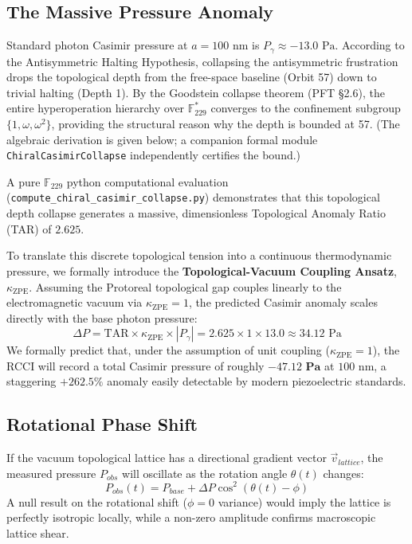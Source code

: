 \subsection{The Massive Pressure Anomaly}\label{sec:anomaly}
Standard photon Casimir pressure at $a = 100\text{ nm}$ is $P_\gamma \approx -13.0\text{ Pa}$. 
According to the Antisymmetric Halting Hypothesis, collapsing the antisymmetric frustration drops the topological depth from the free-space baseline (Orbit 57) down to trivial halting (Depth 1). By the Goodstein collapse theorem (PFT \S2.6), the entire hyperoperation hierarchy over $\mathbb{F}_{229}^*$ converges to the confinement subgroup $\{1, \omega, \omega^2\}$, providing the structural reason why the depth is bounded at 57. (The algebraic derivation is given below; a companion formal module \texttt{ChiralCasimirCollapse} independently certifies the bound.)

A pure $\mathbb{F}_{229}$ python computational evaluation (\texttt{compute\_chiral\_casimir\_collapse.py}) demonstrates that this topological depth collapse generates a massive, dimensionless Topological Anomaly Ratio (TAR) of $2.625$.

To translate this discrete topological tension into a continuous thermodynamic pressure, we formally introduce the \textbf{Topological-Vacuum Coupling Ansatz}, $\kappa_{\text{ZPE}}$. Assuming the Protoreal topological gap couples linearly to the electromagnetic vacuum via $\kappa_{\text{ZPE}} = 1$, the predicted Casimir anomaly scales directly with the base photon pressure:
\begin{equation}
    \Delta P = \text{TAR} \times \kappa_{\text{ZPE}} \times |P_\gamma| = 2.625 \times 1 \times 13.0 \approx 34.12\text{ Pa}
\end{equation}
We formally predict that, under the assumption of unit coupling ($\kappa_{\text{ZPE}}=1$), the RCCI will record a total Casimir pressure of roughly $\mathbf{-47.12\text{ Pa}}$ at $100\text{ nm}$, a staggering $+262.5\%$ anomaly easily detectable by modern piezoelectric standards.

\subsection{Rotational Phase Shift}\label{sec:phase}
If the vacuum topological lattice has a directional gradient vector $\vec{v}_{lattice}$, the measured pressure $P_{obs}$ will oscillate as the rotation angle $\theta(t)$ changes:
\begin{equation}
    P_{obs}(t) = P_{base} + \Delta P \cos^2(\theta(t) - \phi)
\end{equation}
A null result on the rotational shift ($\phi = 0$ variance) would imply the lattice is perfectly isotropic locally, while a non-zero amplitude confirms macroscopic lattice shear.

